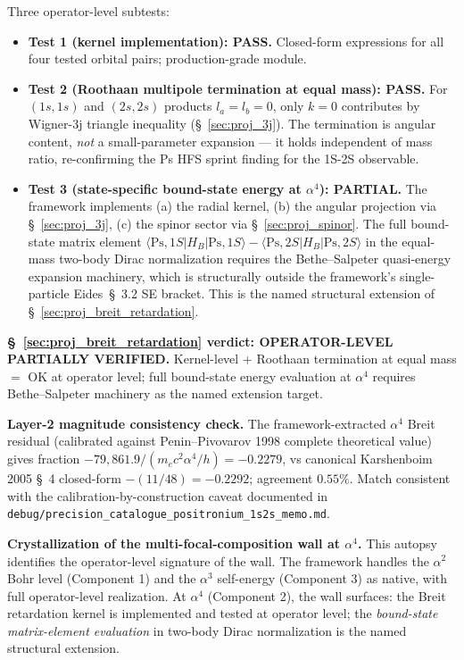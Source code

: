 \documentclass[11pt]{article}
\begin{document}
Three operator-level subtests:
\begin{itemize}\setlength\itemsep{0pt}
\item \textbf{Test 1 (kernel implementation): PASS.}  Closed-form
expressions for all four tested orbital pairs; production-grade module.
\item \textbf{Test 2 (Roothaan multipole termination at equal mass):
PASS.}  For $(1s,1s)$ and $(2s,2s)$ products $l_a = l_b = 0$, only $k=0$
contributes by Wigner-3j triangle inequality (\S~\ref{sec:proj_3j}).
The termination is angular content, \emph{not} a small-parameter
expansion --- it holds independent of mass ratio, re-confirming the
Ps HFS sprint finding for the 1S-2S observable.
\item \textbf{Test 3 (state-specific bound-state energy at $\alpha^4$):
PARTIAL.}  The framework implements (a) the radial kernel, (b) the
angular projection via \S~\ref{sec:proj_3j}, (c) the spinor sector
via \S~\ref{sec:proj_spinor}.  The full bound-state matrix element
$\langle \text{Ps}, 1S | H_B | \text{Ps}, 1S\rangle - \langle
\text{Ps}, 2S | H_B | \text{Ps}, 2S\rangle$ in the equal-mass two-body
Dirac normalization requires the Bethe--Salpeter quasi-energy expansion
machinery, which is structurally outside the framework's single-particle
Eides~\S~3.2 SE bracket.  This is the named structural extension of
\S~\ref{sec:proj_breit_retardation}.
\end{itemize}

\noindent
\textbf{\S~\ref{sec:proj_breit_retardation} verdict: OPERATOR-LEVEL
PARTIALLY VERIFIED.}  Kernel-level + Roothaan termination at equal mass
$=$ OK at operator level; full bound-state energy evaluation at $\alpha^4$
requires Bethe--Salpeter machinery as the named extension target.

\textbf{Layer-2 magnitude consistency check.}  The framework-extracted
$\alpha^4$ Breit residual (calibrated against Penin--Pivovarov 1998
complete theoretical value) gives fraction
$-79{,}861.9 / (m_e c^2 \alpha^4 / h) = -0.2279$, vs canonical
Karshenboim 2005 \S~4 closed-form $-(11/48) = -0.2292$; agreement
$0.55\%$.  Match consistent with the calibration-by-construction
caveat documented in \texttt{debug/precision\_catalogue\_positronium\_1s2s\_memo.md}.

\textbf{Crystallization of the multi-focal-composition wall at $\alpha^4$.}
This autopsy identifies the operator-level signature of the wall.  The
framework handles the $\alpha^2$ Bohr level (Component 1) and the
$\alpha^3$ self-energy (Component 3) as native, with full operator-level
realization.  At $\alpha^4$ (Component 2), the wall surfaces: the Breit
retardation kernel is implemented and tested at operator level; the
\emph{bound-state matrix-element evaluation} in two-body Dirac
normalization is the named structural extension.
\end{document}
